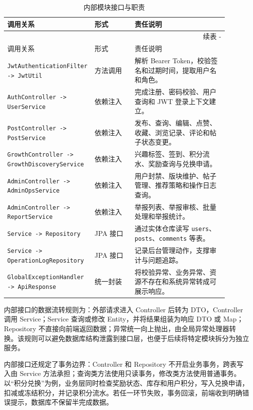 \documentclass[UTF8,zihao=-4,a4paper]{ctexart}
\renewcommand{\thetable}{\thesection-\arabic{table}}
\begin{document}
\begin{longtable}{L{0.30\linewidth}L{0.18\linewidth}L{0.42\linewidth}}
\caption{内部模块接口与职责}\\
\toprule
调用关系 & 形式 & 责任说明 \\
\midrule
\endfirsthead
\multicolumn{3}{r}{续表 \thetable}\\
\toprule
调用关系 & 形式 & 责任说明 \\
\midrule
\endhead
\bottomrule
\endfoot
\texttt{JwtAuthenticationFilter -> JwtUtil} & 方法调用 & 解析 Bearer Token，校验签名和过期时间，提取用户名和角色。\\
\texttt{AuthController -> UserService} & 依赖注入 & 完成注册、密码校验、用户查询和 JWT 登录上下文建立。\\
\texttt{PostController -> PostService} & 依赖注入 & 发布、查询、编辑、点赞、收藏、浏览记录、评论和帖子状态变更。\\
\texttt{GrowthController -> GrowthDiscoveryService} & 依赖注入 & 兴趣标签、签到、积分流水、奖励查询与兑换申请。\\
\texttt{AdminController -> AdminOpsService} & 依赖注入 & 用户封禁、版块维护、帖子管理、推荐策略和操作日志查询。\\
\texttt{AdminController -> ReportService} & 依赖注入 & 举报列表、举报审核、批量处理和举报统计。\\
\texttt{Service -> Repository} & JPA 接口 & 通过实体仓库读写 \texttt{users}、\texttt{posts}、\texttt{comments} 等表。\\
\texttt{Service -> OperationLogRepository} & JPA 接口 & 记录后台管理动作，支撑审计与问题追踪。\\
\texttt{GlobalExceptionHandler -> ApiResponse} & 统一封装 & 将校验异常、业务异常、资源不存在和系统异常转成可展示响应。\\
\end{longtable}

内部接口的数据流转规则为：外部请求进入 Controller 后转为 DTO，Controller 调用 Service；Service 查询或修改 Entity，并将结果组装为响应 DTO 或 Map；Repository 不直接向前端返回数据；异常统一向上抛出，由全局异常处理器转换。该规则可以避免数据库结构泄露到接口层，也便于后续将特定模块拆分为独立服务。

内部接口还规定了事务边界：Controller 和 Repository 不开启业务事务，跨表写入由 Service 方法承担；查询类方法使用只读事务，修改类方法使用普通事务。以“积分兑换”为例，业务层同时检查奖励状态、库存和用户积分，写入兑换申请，扣减或冻结积分，并记录积分流水。若任一环节失败，事务回滚，前端收到明确错误提示，数据库不保留半完成数据。
\end{document}
